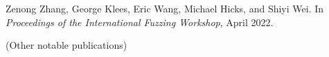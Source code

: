 \documentclass[11pt]{article}
\begin{document}
\begin{description}
\item
Zenong Zhang, George Klees, Eric Wang, Michael Hicks, and Shiyi Wei.
 In {\em Proceedings of the International Fuzzing Workshop}, April
  2022.








\item
\item (Other notable publications)


\end{description}
\end{document}
